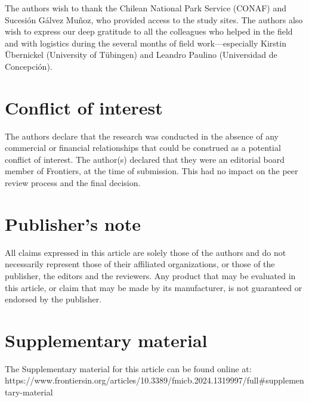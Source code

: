 The authors wish to thank the Chilean National Park Service (CONAF) and Sucesión Gálvez Muñoz, who provided access to the study sites. The authors also wish to express our deep gratitude to all the colleagues who helped in the field and with logistics during the several months of field work—especially Kirstin Übernickel (University of Tübingen) and Leandro Paulino (Universidad de Concepción).

\section*{Conflict of interest}

The authors declare that the research was conducted in the absence of any commercial or financial relationships that could be construed as a potential conflict of interest. The author(s) declared that they were an editorial board member of Frontiers, at the time of submission. This had no impact on the peer review process and the final decision.

\section*{Publisher's note}

All claims expressed in this article are solely those of the authors and do not necessarily represent those of their affiliated organizations, or those of the publisher, the editors and the reviewers. Any product that may be evaluated in this article, or claim that may be made by its manufacturer, is not guaranteed or endorsed by the publisher.

\section*{Supplementary material}

The Supplementary material for this article can be found online at: 
https://www.frontiersin.org/articles/10.3389/fmicb.2024.1319997/full#supplementary-material

